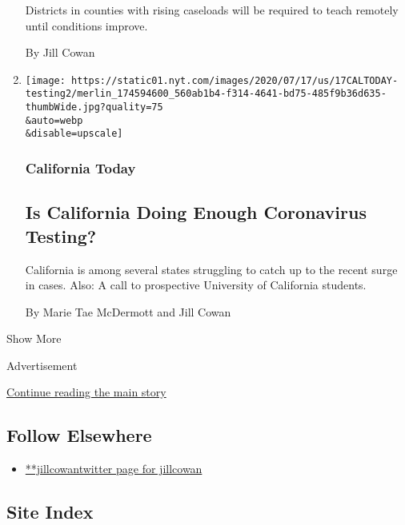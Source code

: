 \begin{enumerate}
  Districts in counties with rising caseloads will be required to teach
  remotely until conditions improve.

  By Jill Cowan
\item
  \href{/2020/07/17/us/ca-coronavirus-covid-testing.html}{}

  \texttt{[image: https://static01.nyt.com/images/2020/07/17/us/17CALTODAY-testing2/merlin\_174594600\_560ab1b4-f314-4641-bd75-485f9b36d635-thumbWide.jpg?quality=75\\\&auto=webp\\\&disable=upscale]}

  \hypertarget{california-today-7}{%
  \subsubsection{California Today}\label{california-today-7}}

  \hypertarget{is-california-doing-enough-coronavirus-testing}{%
  \subsection{Is California Doing Enough Coronavirus
  Testing?}\label{is-california-doing-enough-coronavirus-testing}}

  California is among several states struggling to catch up to the
  recent surge in cases. Also: A call to prospective University of
  California students.

  By Marie Tae McDermott and Jill Cowan
\end{enumerate}

Show More

Advertisement

\protect\hyperlink{after-mid2}{Continue reading the main story}

\hypertarget{follow-elsewhere}{%
\subsection{Follow Elsewhere}\label{follow-elsewhere}}

\begin{itemize}
\tightlist
\item
  \href{https://twitter.com/jillcowan}{**jillcowantwitter page for
  jillcowan}
\end{itemize}

\hypertarget{site-index}{%
\subsection{Site Index}\label{site-index}}

